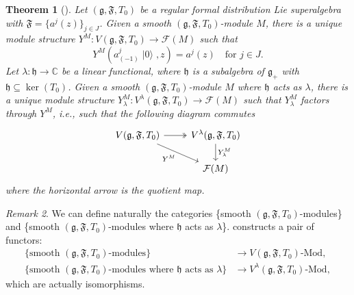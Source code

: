 \documentclass[a4paper, 12pt, reqno]{amsart}
\newtheorem{theorem}{Theorem}[section]
\theoremstyle{remark}
\newtheorem{remark}[theorem]{Remark}
\DeclareMathOperator{\vac}{|0\rangle}
\begin{document}
\begin{theorem}[{\cite[Theorem 2.15]{li_vertex_2004}}]
  \label{thr:25}
  Let $(\mathfrak{g}, \mathfrak{F}, T_0)$ be a regular formal distribution Lie superalgebra with $\mathfrak{F} = \{a^j(z)\}_{j \in J}$.
  Given a smooth $(\mathfrak{g}, \mathfrak{F}, T_0)$-module $M$, there is a unique module structure $Y^M: V(\mathfrak{g}, \mathfrak{F}, T_0) \to \mathcal{F}(M)$ such that
  \begin{equation*}
    Y^M(a^j_{(-1)}\vac, z) = a^j(z) \quad \text{for $j \in J$}.
  \end{equation*}
  Let $\lambda: \mathfrak{h} \to \mathbb{C}$ be a linear functional, where $\mathfrak{h}$ is a subalgebra of $\mathfrak{g}_+$ with $\mathfrak{h} \subseteq \ker(T_0)$.
  Given a smooth $(\mathfrak{g}, \mathfrak{F}, T_0)$-module $M$ where $\mathfrak{h}$ acts as $\lambda$, there is a unique module structure $Y^M_{\lambda}: V^{\lambda}(\mathfrak{g}, \mathfrak{F}, T_0) \to \mathcal{F}(M)$ such that $Y^M_{\lambda}$ factors through $Y^M$, i.e., such that the following diagram commutes
  \begin{equation*}
    \begin{tikzcd}
      V(\mathfrak{g}, \mathfrak{F}, T_0) \arrow[r, two heads] \arrow[rd, "{Y^M}"'] & {V^{\lambda}(\mathfrak{g}, \mathfrak{F}, T_0)} \arrow[d, "{Y^M_{\lambda}}"] \\
      & {\mathcal{F}(M)}
    \end{tikzcd}
  \end{equation*}
  where the horizontal arrow is the quotient map.
\end{theorem}

\begin{remark}
  \label{rmk:23}
  We can define naturally the categories \{smooth $(\mathfrak{g}, \mathfrak{F}, T_0)$-modules\} and \{smooth $(\mathfrak{g}, \mathfrak{F}, T_0)$-modules where $\mathfrak{h}$ acts as $\lambda$\}.
   constructs a pair of functors:
  \begin{align*}
    \{\text{smooth $(\mathfrak{g}, \mathfrak{F}, T_0)$-modules}\} &\to \text{$V(\mathfrak{g}, \mathfrak{F}, T_0)$-Mod}, \\
    \{\text{smooth $(\mathfrak{g}, \mathfrak{F}, T_0)$-modules where $\mathfrak{h}$ acts as $\lambda$}\} &\to \text{$V^{\lambda}(\mathfrak{g}, \mathfrak{F}, T_0)$-Mod},
  \end{align*}
  which are actually isomorphisms.
\end{remark}
\end{document}
